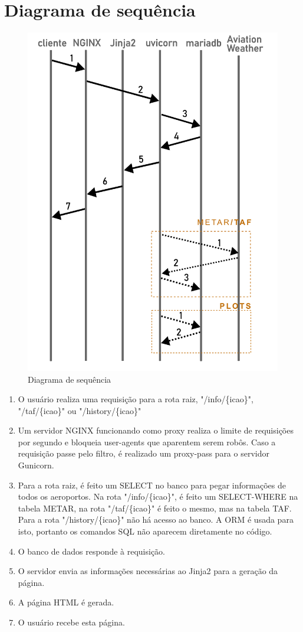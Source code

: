 \section{Diagrama de sequência}

\begin{figure}[ht]
    \begin{center}
    \includegraphics[width=0.5\linewidth]{img/diagrama-tempo.png}
    \caption{Diagrama de sequência}
    \label{fig:tempo}
    \end{center}
\end{figure}

\begin{enumerate}
\item O usuário realiza uma requisição para a rota raiz, "/info/\{icao\}", "/taf/\{icao\}"
ou "/history/\{icao\}"
\item Um servidor NGINX funcionando como proxy realiza o limite de requisições por segundo
e bloqueia user-agents que aparentem serem robôs. Caso a requisição passe pelo filtro, é
realizado um proxy-pass para o servidor Gunicorn.
\item Para a rota raiz, é feito um SELECT no banco para pegar informações de todos os
aeroportos. Na rota "/info/\{icao\}", é feito um SELECT-WHERE na tabela METAR,
na rota "/taf/\{icao\}" é feito o mesmo, mas na tabela TAF. Para a rota "/history/\{icao\}"
não há acesso ao banco.
A ORM é usada para isto, portanto os comandos SQL não aparecem diretamente no código.
\item O banco de dados responde à requisição.
\item O servidor envia as informações necessárias ao Jinja2 para a geração da página.
\item A página HTML é gerada.
\item O usuário recebe esta página.
\end{enumerate}

